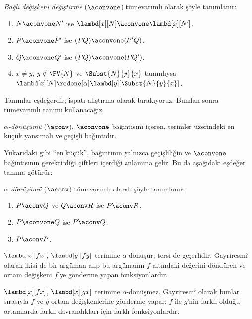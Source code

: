 \documentclass[../../../include/open-logic-section]{subfiles}
\begin{document}
\begin{defn} 
  \emph{Bağlı değişkeni değiştirme} ($\aconvone$) tümevarımlı olarak şöyle
  tanımlanır:
  \begin{enumerate}
  \item $N \aconvone N'$ ise $\lambd[x][N] \aconvone
    \lambd[x][N']$. 
  \item $P \aconvone P'$ ise $(PQ) \aconvone (P'Q)$.
  \item $Q \aconvone Q'$ ise $(PQ) \aconvone (PQ')$.
  \item $x \neq y$, $y \notin \FV{N}$ ve $\Subst{N}{y}{x}$ tanımlıysa
    $\lambd[x][N] \redone[\alpha] \lambd[y][\Subst{N}{y}{x}]$.
  \end{enumerate}
\end{defn}

Tanımlar eşdeğerdir; ispatı alıştırma olarak bırakıyoruz. Bundan sonra
tümevarımlı tanımı kullanacağız.

\begin{defn}
  \emph{$\alpha$-dönüşümü} ($\aconv$), $\aconvone$ bağıntısını içeren,
  terimler üzerindeki en küçük yansımalı ve geçişli bağıntıdır.
\end{defn}

Yukarıdaki gibi ``en küçük'', bağıntının yalnızca geçişliliğin ve
$\aconvone$ bağıntısının gerektirdiği çiftleri içerdiği anlamına gelir. Bu da
aşağıdaki eşdeğer tanıma götürür:

\begin{defn} 
  \emph{$\alpha$-dönüşümü} ($\aconv$) tümevarımlı olarak şöyle tanımlanır:
  \begin{enumerate}
  \item $P \aconv Q$ ve $Q \aconv R$ ise $P \aconv R$.
  \item $P \aconvone Q$ ise $P \aconv Q$. 
  \item $P \aconv P$. 
  \end{enumerate}
\end{defn}

\begin{ex}
  $\lambd[x][f x]$, $\lambd[y][f y]$ terimine $\alpha$-dönüşür; tersi de
  geçerlidir. Gayriresmî olarak ikisi de bir argüman alıp bu argümanın $f$
  altındaki değerini döndüren ve ortam değişkeni $f$'ye gönderme yapan
  fonksiyonlardır.

  $\lambd[x][f x]$, $\lambd[x][g x]$ terimine $\alpha$-dönüşmez.
  Gayriresmî olarak bunlar sırasıyla $f$ ve $g$ ortam değişkenlerine gönderme
  yapar; $f$ ile $g$'nin farklı olduğu ortamlarda farklı davrandıkları için
  farklı fonksiyonlardır.
\end{ex}
\end{document}
